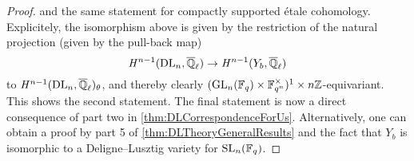 \documentclass[../main.tex]{subfiles}
\begin{document}
\begin{lem}
\begin{proof}
  and the same statement for compactly supported \'etale cohomology. 
  Explicitely, the isomorphism above is given by the restriction of the natural
  projection (given by the pull-back map)
    \begin{equation*}
      \mathit H^{n-1}(\mathrm{DL}_n, {\overline {\mathbb{Q}}_\ell}) \to \mathit H^{n-1}(Y_b, {\overline {\mathbb{Q}}_\ell})
    \end{equation*}
    to $\mathit H^{n-1}(\mathrm{DL}_n, {\overline {\mathbb{Q}}_\ell})_\theta$,
    and thereby clearly $(\operatorname{GL}_n(\mathbb{F}_q) \times \mathbb{F}_{q^n}^\times)^1 \times
    n\mathbb{Z}$-equivariant. This shows the second statement.
    The final statement is now a direct consequence of part two in 
    \cref{thm:DLCorrespondenceForUs}. Alternatively, one can obtain a proof by
    part 5 of \cref{thm:DLTheoryGeneralResults} and the fact that $Y_b$ is
    isomorphic to a Deligne--Lusztig variety for $\operatorname{SL}_n(\mathbb{F}_q)$.
\end{proof}
\end{lem}


\end{document}
